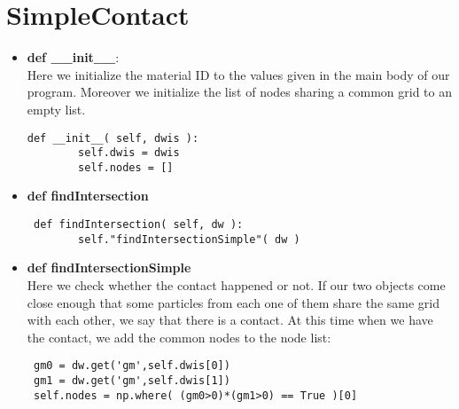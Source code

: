 \section{SimpleContact}
\begin{itemize}
\item \textbf{def \_\_init\_\_}:\\
Here we initialize the material ID to the values given in the main body of our program. Moreover we initialize the list of nodes sharing a common grid to an empty list. 
\begin{lstlisting}
def __init__( self, dwis ):
        self.dwis = dwis
        self.nodes = []
\end{lstlisting}
\item \textbf{def findIntersection}\\
\begin{lstlisting}
 def findIntersection( self, dw ):
        self."findIntersectionSimple"( dw )
\end{lstlisting}
\item \textbf{def findIntersectionSimple}\\
Here we check whether the contact happened or not. If our two objects come close enough that some particles from each one of them share the same grid with each other, we say that there is a contact. At this time when we have the contact, we add the common nodes to the node list:
\begin{lstlisting}
 gm0 = dw.get('gm',self.dwis[0])
 gm1 = dw.get('gm',self.dwis[1])
 self.nodes = np.where( (gm0>0)*(gm1>0) == True )[0]
\end{lstlisting}
\end{itemize}
